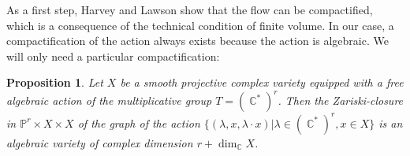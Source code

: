 \documentclass[12pt]{amsbook}%
\newtheorem{prop}[thm]{Proposition}
\theoremstyle{definition}
\theoremstyle{remark}
\numberwithin{section}{chapter}
\numberwithin{subsection}{section}
\numberwithin{figure}{chapter}
\DeclareMathOperator{\C}{\mathbb{C}}
\DeclareMathOperator{\Th}{Th}
\DeclareMathOperator{\R}{\mathbb{R}}
\newcommand\intcur[1]{\llbracket #1 \rrbracket}
\def\bP{{\mathbb{P}}}
\begin{document}
{{%
As a first step, Harvey and Lawson show that the flow can be compactified, which is a consequence of the technical condition of  finite volume.
In our case, a compactification of the action always exists because the action is algebraic. We will only need a particular compactification: 

\begin{prop} Let $X$ be a smooth projective complex variety equipped with a free algebraic action of the multiplicative group $T=(\C^*)^r$.
Then the Zariski-closure in $\bP^r \times X\times X$ of the graph of the action $ \{(\lambda, x, \lambda\cdot  x) | \lambda\in (\C^*)^r , x\in X \}$  is an algebraic variety of complex dimension $r+ \dim_{\C} X$.   
\end{prop}

}}
\end{document}
